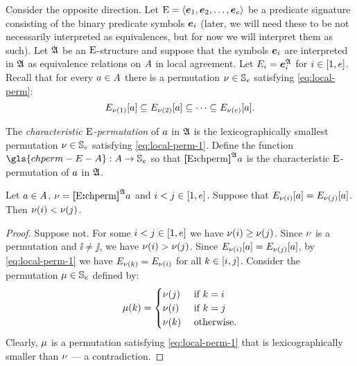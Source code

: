 Consider the opposite direction.
Let ${\mathrm{E}} = \left\langle \bm{e}_{1},\bm{e}_{2},\dots,\bm{e}_{e} \right\rangle$ be a predicate signature consisting
of the binary predicate symbols $\bm{e}_{i}$ (later, we will need these to be
not necessarily interpreted as equivalences, but for now we will interpret
them as such).
Let $\mathfrak{A}$ be an ${\mathrm{E}}$-structure and suppose that the symbols $\bm{e}_{i}$ are
interpreted in $\mathfrak{A}$ as equivalence relations on $A$ in local agreement.
Let $E_{i} = \bm{e}_{i}^{\mathfrak{A}}$ for $i \in [1,e]$.
Recall that for every $a \in A$ there is a permutation
$\nu \in \mathbb{S}_{e}$ satisfying \cref{eq:local-perm}:
\begin{equation}\label{eq:local-perm-1}
  E_{\nu(1)}[a] \subseteq
  E_{\nu(2)}[a] \subseteq \dots \subseteq
  E_{\nu(e)}[a].
\end{equation}
\begin{definition}
The \emph{characteristic ${\mathrm{E}}$-permutation} of $a$ in $\mathfrak{A}$ is
the lexicographically smallest permutation $\nu \in \mathbb{S}_{e}$
satisfying \cref{eq:local-perm-1}.
Define the function $\gls{chperm-E-A} : \domA \to \Perms\sze$ so
that ${\bm{[}{\mathrm{E}}\mathord{\bm{:}}\mathrm{chperm}\bm{]}}^{\mathfrak{A}}a$ is the characteristic ${\mathrm{E}}$-permutation of $a$ in
$\mathfrak{A}$.
\end{definition}
\begin{remark}\label{rem:local-eq-perm}
Let $a \in A$, $\nu = {\bm{[}{\mathrm{E}}\mathord{\bm{:}}\mathrm{chperm}\bm{]}}^{\mathfrak{A}}a$ and
$i < j \in [1,e]$.
Suppose that $E_{\nu(i)}[a] = E_{\nu(j)}[a]$.
Then $\nu(i) < \nu(j)$.
\end{remark}
\begin{proof}
Suppose not. For some $i < j \in [1,e]$ we have
$\nu(i) \geq \nu(j)$.
Since $\nu$ is a permutation and $\ii \neq \jj$,
we have $\nu(i) > \nu(j)$.
Since $E_{\nu(i)}[a] = E_{\nu(j)}[a]$,
by \cref{eq:local-perm-1} we have $E_{\nu(k)} = E_{\nu(i)}$
for all $k \in [i, j]$.
Consider the permutation $\mu \in \mathbb{S}_{e}$ defined by:
\[
  \mu(k) = \begin{cases}
    \nu(j) &\text{ if } k = i \\
    \nu(i) &\text{ if } k = j \\
    \nu(k) &\text{ otherwise.}
  \end{cases}
\]
Clearly, $\mu$ is a permutation satisfying \cref{eq:local-perm-1} that is
lexicographically smaller than $\nu$ --- a contradiction.
\end{proof}

